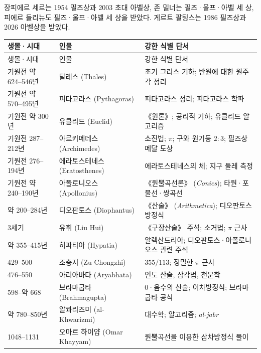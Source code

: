 \begin{fact}[주요 교차 수상]
장피에르 세르는 1954 필즈상과 2003 초대 아벨상, 존 밀너는 필즈·울프·아벨 세 상, 피에르 들리뉴도 필즈·울프·아벨 세 상을 받았다. 게르트 팔팅스는 1986 필즈상과 2026 아벨상을 받았다.
\end{fact}


\begin{center}
\footnotesize
\setlength{\tabcolsep}{2.2pt}
\renewcommand{\arraystretch}{1.08}
\begin{longtable}{@{}L{0.16\textwidth}L{0.24\textwidth}L{0.52\textwidth}@{}}
\toprule
생몰·시대 & 인물 & 강한 식별 단서\\
\midrule
\endfirsthead
\toprule 생몰·시대 & 인물 & 강한 식별 단서\\ \midrule \endhead
\bottomrule\endlastfoot
기원전 약 624--546년 & 탈레스 (Thales) & 초기 그리스 기하; 반원에 대한 원주각 정리\\
기원전 약 570--495년 & 피타고라스 (Pythagoras) & 피타고라스 정리; 피타고라스 학파\\
기원전 약 300년 & 유클리드 (Euclid) & 《원론》; 공리적 기하; 유클리드 알고리즘\\
기원전 287--212년 & 아르키메데스 (Archimedes) & 소진법; $\pi$; 구와 원기둥 $2:3$; 필즈상 메달 도상\\
기원전 276--194년 & 에라토스테네스 (Eratosthenes) & 에라토스테네스의 체; 지구 둘레 측정\\
기원전 약 240--190년 & 아폴로니오스 (Apollonius) & 《원뿔곡선론》 (\textit{Conics}); 타원·포물선·쌍곡선\\
약 200--284년 & 디오판토스 (Diophantus) & 《산술》 (\textit{Arithmetica}); 디오판토스 방정식\\
3세기 & 유휘 (Liu Hui) & 《구장산술》 주석; 소거법; $\pi$ 근사\\
약 355--415년 & 히파티아 (Hypatia) & 알렉산드리아; 디오판토스·아폴로니오스 관련 주석\\
429--500 & 조충지 (Zu Chongzhi) & $355/113$; 정밀한 $\pi$ 근사\\
476--550 & 아리아바타 (Aryabhata) & 인도 산술, 삼각법, 천문학\\
598--약 668 & 브라마굽타 (Brahmagupta) & 0·음수의 산술; 이차방정식; 브라마굽타 공식\\
약 780--850년 & 알콰리즈미 (al-Khwarizmi) & 대수학; 알고리즘; \textit{al-jabr}\\
1048--1131 & 오마르 하이얌 (Omar Khayyam) & 원뿔곡선을 이용한 삼차방정식 풀이\\

\end{longtable}
\end{center}
